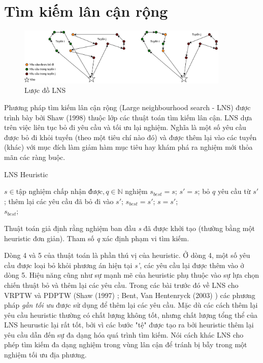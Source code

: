 \section{Tìm kiếm lân cận rộng}

\begin{figure}[H] %
  \centering %
  \includegraphics[width=0.9\textwidth]{figures/ALNS-paradim.png} 
  \caption{Lược đồ LNS} 
  \label{fig:lns_paradim}
\end{figure}

Phương pháp tìm kiếm lân cận rộng (Large neighbourhood search - LNS) được trình bày bởi Shaw (1998) \cite{shaw1998using} thuộc lớp các thuật toán tìm kiếm lân cận. LNS dựa trên việc liên tục bỏ đi yêu cầu và tối ưu lại nghiệm. Nghĩa là một số yêu cầu được bỏ đi khỏi tuyến (theo một tiêu chí nào đó) và được thêm lại vào các tuyến (khác) với mục đích làm giảm hàm mục tiêu hay khám phá ra nghiệm mới thỏa mãn các ràng buộc.

\begin{algorithm}
  \label{alg:lns}
	\caption{LNS Heuristic} 
	\begin{algorithmic}[1]
        \Require $s \in \text{tập nghiệm chấp nhận được}, q \in \mathbb{N}$
        \State nghiệm $s_{best} = s$;
				\Repeat
					\State $s'=s$;
					\State bỏ $q$ yêu cầu từ $s'$;
					\State thêm lại các yêu cầu đã bỏ đi vào $s'$;
						\State $s_{best} = s'$;
					\EndIf
						\State $s=s'$;
					\EndIf
				\\
				\Return $s_{best}$;
	\end{algorithmic} 
\end{algorithm}

Thuật toán giả định rằng nghiệm ban đầu \textit{s} đã được khởi tạo (thường bằng một heuristic đơn giản). Tham số \textit{q} xác định phạm vi tìm kiếm. 

Dòng 4 và 5 của thuật toán là phần thú vị của heuristic. Ở dòng 4, một số yêu cầu được loại bỏ khỏi phương án hiện tại \textit{s'}, các yêu cầu lại được thêm vào ở dòng 5. Hiệu năng cũng như sự mạnh mẽ của heuristic phụ thuộc vào sự lựa chọn chiến thuật bỏ và thêm lại các yêu cầu. Trong các bài trước đó về LNS cho VRPTW và PDPTW (Shaw (1997) \cite{shaw1997new}; Bent, Van Hentenryck (2003) \cite{bent2003two}) các phương pháp \textit{gần tối ưu} được sử dụng để thêm lại các yêu cầu. Mặc dù các cách thêm lại yêu cầu heuristic thường có chất lượng không tốt, nhưng chất lượng tổng thể của LNS heurustic lại rất tốt, bởi vì các bước "tệ" được tạo ra bởi heuristic thêm lại yêu cầu dẫn đến sự đa dạng hóa quá trình tìm kiếm. Nói cách khác LNS cho phép tìm kiếm đa dạng nghiệm trong vùng lân cận để tránh bị bẫy trong một nghiệm tối ưu địa phương.


